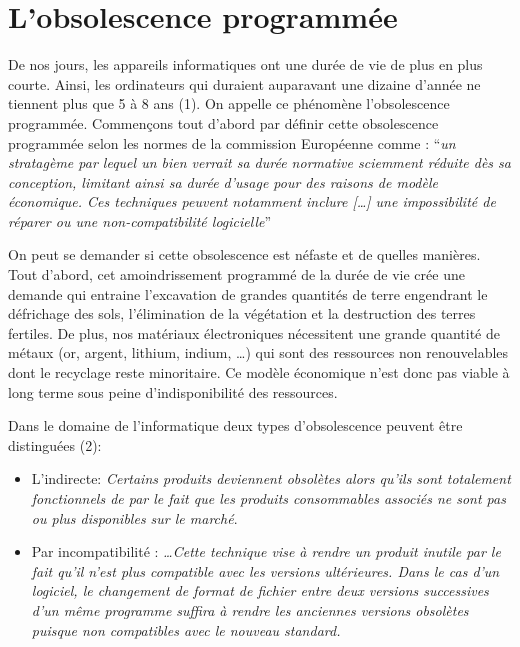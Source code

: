 \documentclass[10pt]{../fiche}
\begin{document}
\section*{L'obsolescence programmée}

De nos jours, les appareils informatiques ont une durée de vie de plus en plus
courte. Ainsi, les ordinateurs qui duraient auparavant une dizaine d'année ne
tiennent plus que 5 à 8 ans (1). On appelle ce phénomène l'obsolescence
programmée. Commençons tout d'abord par définir  cette obsolescence programmée
selon les normes de la commission
Européenne comme :
``\textit{un stratagème par lequel un bien verrait sa durée
normative sciemment réduite dès sa conception, limitant
ainsi sa durée d'usage pour des raisons de modèle économique.
Ces techniques peuvent notamment inclure
[\dots] une impossibilité de réparer ou une non-compatibilité
logicielle}''

On peut se demander si cette obsolescence est néfaste et de quelles manières.
Tout d'abord, cet amoindrissement programmé de la durée de vie crée une demande
qui entraine l'excavation de grandes quantités de terre engendrant le
défrichage des sols, l'élimination de la végétation et la destruction des
terres fertiles. De plus, nos matériaux électroniques nécessitent une grande
quantité de métaux (or, argent, lithium, indium, \dots) qui sont des ressources
non renouvelables dont le recyclage reste minoritaire. Ce modèle économique
n'est donc pas viable à long terme sous peine d'indisponibilité des ressources.

Dans le domaine de l'informatique deux types d'obsolescence peuvent être distinguées (2):
\begin{itemize}
  \item L'indirecte: \og\textit{Certains produits deviennent obsolètes alors
      qu'ils sont totalement fonctionnels de par le fait que les produits
  consommables associés ne sont pas ou plus disponibles sur le marché}.\fg

  \item Par incompatibilité : \og\textit{\dots Cette technique vise à rendre un
          produit inutile par le fait qu'il n'est plus compatible avec les
          versions ultérieures. Dans le cas d'un logiciel, le changement de
          format de fichier entre deux versions successives d'un même programme
          suffira à rendre les anciennes versions obsolètes puisque non
      compatibles avec le nouveau standard.}\fg
\end{itemize}
\end{document}

